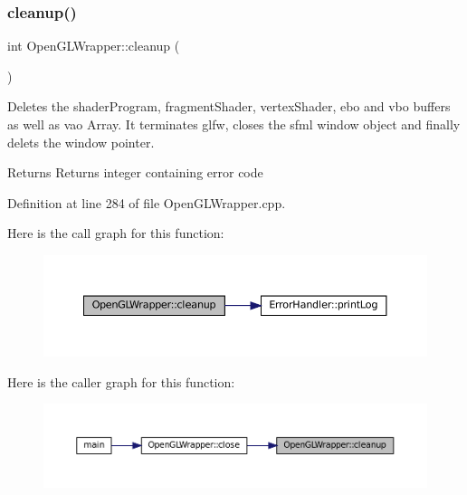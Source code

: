 \subsubsection{\texorpdfstring{cleanup()}{cleanup()}}
{\footnotesize\ttfamily int Open\+G\+L\+Wrapper\+::cleanup (\begin{DoxyParamCaption}{ }\end{DoxyParamCaption})\hspace{0.3cm}{\ttfamily [private]}}



Deletes the shader\+Program, fragment\+Shader, vertex\+Shader, ebo and vbo buffers as well as vao Array. It terminates glfw, closes the sfml window object and finally delets the window pointer. 

\begin{DoxyReturn}{Returns}
Returns integer containing error code 
\end{DoxyReturn}


Definition at line 284 of file Open\+G\+L\+Wrapper.\+cpp.

Here is the call graph for this function\+:\nopagebreak
\begin{figure}[H]
\begin{center}
\leavevmode
\includegraphics[width=350pt]{classOpenGLWrapper_a0c878818b04f78dd90e44dfed481ccab_cgraph}
\end{center}
\end{figure}
Here is the caller graph for this function\+:\nopagebreak
\begin{figure}[H]
\begin{center}
\leavevmode
\includegraphics[width=350pt]{classOpenGLWrapper_a0c878818b04f78dd90e44dfed481ccab_icgraph}
\end{center}
\end{figure}
\mbox{\label{classOpenGLWrapper_af7418fa6074f3c2044b042edf19326c8}} 

